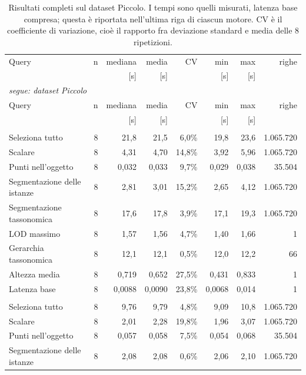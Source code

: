 \begin{small}
\begin{longtable}{lrrrrrr r}
\caption{Risultati completi sul dataset Piccolo. I tempi sono quelli misurati, latenza base compresa; questa è riportata nell'ultima riga di ciascun motore. CV è il coefficiente di variazione, cioè il rapporto fra deviazione standard e media delle 8 ripetizioni.}\label{tab:raw_ytu3d}\\
\toprule
Query & n & mediana & media & CV & min & max & righe \\
 & & [s] & [s] & & [s] & [s] & \\
\midrule
\endfirsthead
\multicolumn{8}{l}{\small\itshape segue: dataset Piccolo}\\
\toprule
Query & n & mediana & media & CV & min & max & righe \\
 & & [s] & [s] & & [s] & [s] & \\
\midrule
\endhead
\endfoot
\bottomrule
\endlastfoot
\multicolumn{8}{l}{\textbf{Fuseki}}\\
\quad Seleziona tutto & 8 & 21,8 & 21,5 & 6,0\% & 19,8 & 23,6 & 1.065.720 \\
\quad Scalare & 8 & 4,31 & 4,70 & 14,8\% & 3,92 & 5,96 & 1.065.720 \\
\quad Punti nell'oggetto & 8 & 0,032 & 0,033 & 9,7\% & 0,029 & 0,038 & 35.504 \\
\quad Segmentazione delle istanze & 8 & 2,81 & 3,01 & 15,2\% & 2,65 & 4,12 & 1.065.720 \\
\quad Segmentazione tassonomica & 8 & 17,6 & 17,8 & 3,9\% & 17,1 & 19,3 & 1.065.720 \\
\quad LOD massimo & 8 & 1,57 & 1,56 & 4,7\% & 1,40 & 1,66 & 1 \\
\quad Gerarchia tassonomica & 8 & 12,1 & 12,1 & 0,5\% & 12,0 & 12,2 & 66 \\
\quad Altezza media & 8 & 0,719 & 0,652 & 27,5\% & 0,431 & 0,833 & 1 \\
\quad Latenza base & 8 & 0,0088 & 0,0090 & 23,8\% & 0,0068 & 0,014 & 1 \\
\addlinespace
\multicolumn{8}{l}{\textbf{GraphDB}}\\
\quad Seleziona tutto & 8 & 9,76 & 9,79 & 4,8\% & 9,09 & 10,8 & 1.065.720 \\
\quad Scalare & 8 & 2,01 & 2,28 & 19,8\% & 1,96 & 3,07 & 1.065.720 \\
\quad Punti nell'oggetto & 8 & 0,057 & 0,058 & 7,5\% & 0,054 & 0,068 & 35.504 \\
\quad Segmentazione delle istanze & 8 & 2,08 & 2,08 & 0,6\% & 2,06 & 2,10 & 1.065.720 \\

\end{longtable}
\end{small}
